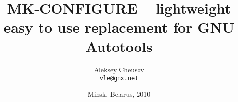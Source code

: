 \documentclass[hyperref={colorlinks=true}]{beamer}
\title{MK-CONFIGURE -- lightweight easy to use replacement for GNU Autotools}
\author{Aleksey Cheusov \\ \texttt{vle@gmx.net}}
\date{Minsk, Belarus, 2010}
\begin{document}

\newenvironment{Code}[1]%
               {\Verbatim[label=\bf{#1},frame=single,%
                   fontsize=\small,%
                   commandchars=\\\{\}]}%
               {\endVerbatim}

\newenvironment{CodeNoLabel}%
               {\Verbatim[frame=single,%
                   fontsize=\small,%
                   commandchars=\\\{\}]}%
               {\endVerbatim}

\newenvironment{CodeNoLabelSmallest}%
               {\Verbatim[frame=single,%
                   fontsize=\footnotesize,%
                   commandchars=\\\{\}]}%
               {\endVerbatim}

\newcommand{\prompt}[1]{\bf{#1}\textnormal{}}
\newcommand{\highlight}[1]{\bf{#1}\textnormal{}}
\newcommand{\URL}[1]{\textbf{#1}}
\newcommand{\AutohellFile}[1]{\textcolor{red}{#1}}
\newcommand{\MKCfile}[1]{\textcolor{green}{#1}}
\newcommand{\ModuleName}[1]{\textbf{#1}\textnormal{}}
\newcommand{\ProgName}[1]{\textbf{#1}\textnormal{}}
\newcommand{\ProjectName}[1]{\textbf{#1}\textnormal{}}
\newcommand{\PackageName}[1]{\textbf{#1}\textnormal{}}
\newcommand{\MKC}[1]{\large\textsf{#1}\textnormal{}\normalsize}



\begin{frame}
  \titlepage
\end{frame}
\end{document}
